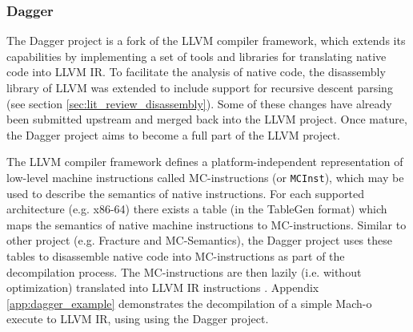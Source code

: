 
\subsubsection{Dagger}
\label{sec:rel_work_dagger}

The Dagger project is a fork of the LLVM compiler framework, which extends its capabilities by implementing a set of tools and libraries for translating native code into LLVM IR. To facilitate the analysis of native code, the disassembly library of LLVM was extended to include support for recursive descent parsing (see section \ref{sec:lit_review_disassembly}). Some of these changes have already been submitted upstream and merged back into the LLVM project. Once mature, the Dagger project aims to become a full part of the LLVM project.

The LLVM compiler framework defines a platform-independent representation of low-level machine instructions called MC-instructions (or \texttt{MCInst}), which may be used to describe the semantics of native instructions. For each supported architecture (e.g. x86-64) there exists a table (in the TableGen format) which maps the semantics of native machine instructions to MC-instructions. Similar to other project (e.g. Fracture and MC-Semantics), the Dagger project uses these tables to disassemble native code into MC-instructions as part of the decompilation process. The MC-instructions are then lazily (i.e. without optimization) translated into LLVM IR instructions \cite{dagger}. Appendix \ref{app:dagger_example} demonstrates the decompilation of a simple Mach-o execute to LLVM IR, using using the Dagger project.

